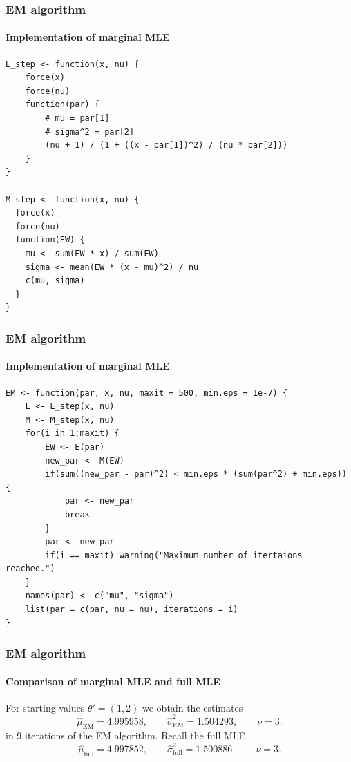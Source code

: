\documentclass[aspectratio=169]{beamer}
\begin{document}
\begin{frame}[fragile]
    \frametitle{EM algorithm}
    \framesubtitle{Implementation of marginal MLE}

\begin{verbatim}
E_step <- function(x, nu) {
    force(x)
    force(nu)
    function(par) {
        # mu = par[1]
        # sigma^2 = par[2]
        (nu + 1) / (1 + ((x - par[1])^2) / (nu * par[2]))
    }
}

M_step <- function(x, nu) {
  force(x)
  force(nu)
  function(EW) {
    mu <- sum(EW * x) / sum(EW)
    sigma <- mean(EW * (x - mu)^2) / nu
    c(mu, sigma)
  }
}
\end{verbatim}

\end{frame}
\begin{frame}[fragile]
    \frametitle{EM algorithm}
    \framesubtitle{Implementation of marginal MLE}

\begin{verbatim}
EM <- function(par, x, nu, maxit = 500, min.eps = 1e-7) {
    E <- E_step(x, nu)
    M <- M_step(x, nu)
    for(i in 1:maxit) {
        EW <- E(par)
        new_par <- M(EW)
        if(sum((new_par - par)^2) < min.eps * (sum(par^2) + min.eps)) {
            par <- new_par
            break
        }
        par <- new_par
        if(i == maxit) warning("Maximum number of itertaions reached.")
    }
    names(par) <- c("mu", "sigma")
    list(par = c(par, nu = nu), iterations = i)
}
\end{verbatim}

\end{frame}

\begin{frame}
    \frametitle{EM algorithm}
    \framesubtitle{Comparison of marginal MLE and full MLE}
    For starting values $\theta' = (1, 2)$ we obtain the estimates
    \begin{equation}
        \hat\mu_{\text{EM}}=4.995958,\quad\quad \hat\sigma^{2}_{\text{EM}}=1.504293,\quad\quad \nu = 3.
    \end{equation}
    in 9 iterations of the EM algorithm. Recall the full MLE
    \begin{equation}
        \hat\mu_{\text{full}} = 4.997852, \quad\quad \hat\sigma^{2}_{\text{full}}=1.500886,\quad\quad \nu = 3.
    \end{equation}
\end{frame}
\end{document}

